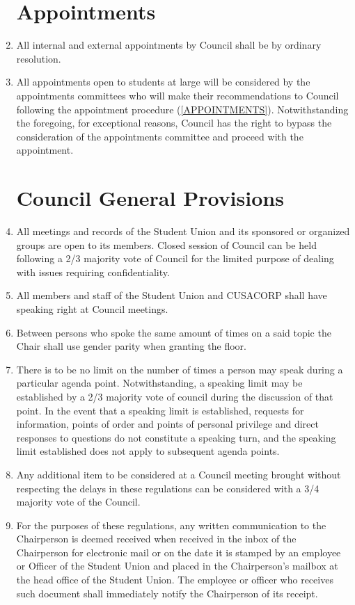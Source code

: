 \documentclass[oneside]{book}
\begin{document}
\begin{enumerate}
\chapter{\label{Appointments}Appointments }
\item All internal and external appointments by Council shall be by ordinary
resolution. 
\item All appointments open to students at large will be considered by the
appointments committees who will make their recommendations to Council
following the appointment procedure (\autoref{APPOINTMENTS}). Notwithstanding the
foregoing, for exceptional reasons, Council has the right to bypass
the consideration of the appointments committee and proceed with the
appointment. 

\chapter{\label{Council_General_Provisions}Council General Provisions }
\item All meetings and records of the Student Union and its sponsored or
organized groups are open to its members. Closed session of Council
can be held following a 2/3 majority vote of Council for the limited
purpose of dealing with issues requiring confidentiality. 
\item All members and staff of the Student Union and CUSACORP shall have
speaking right at Council meetings. 
\item Between persons who spoke the same amount of times on a said topic
the Chair shall use gender parity when granting the floor. 
\item There is to be no limit on the number of times a person may speak
during a particular agenda point. Notwithstanding, a speaking limit
may be established by a 2/3 majority vote of council during the discussion
of that point. In the event that a speaking limit is established,
requests for information, points of order and points of personal privilege
and direct responses to questions do not constitute a speaking turn,
and the speaking limit established does not apply to subsequent agenda
points. 
\item Any additional item to be considered at a Council meeting brought
without respecting the delays in these regulations can be considered
with a 3/4 majority vote of the Council. 
\item For the purposes of these regulations, any written communication to
the Chairperson is deemed received when received in the inbox of the
Chairperson for electronic mail or on the date it is stamped by an
employee or Officer of the Student Union and placed in the Chairperson's
mailbox at the head office of the Student Union. The employee or officer
who receives such document shall immediately notify the Chairperson
of its receipt. 


\end{enumerate}
\end{document}
